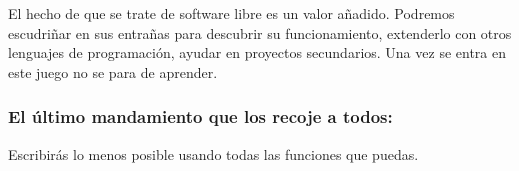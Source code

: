 El hecho de que se trate de software libre es un valor añadido.
Podremos escudriñar en sus entrañas para descubrir su funcionamiento,
extenderlo con otros lenguajes de programación, ayudar en proyectos
secundarios.  Una vez se entra en este juego no se para de aprender.


\subsubsection*{El último mandamiento que los recoje a todos:}

\begin{center}

Escribirás lo menos posible usando todas las funciones que puedas.\end{center}
